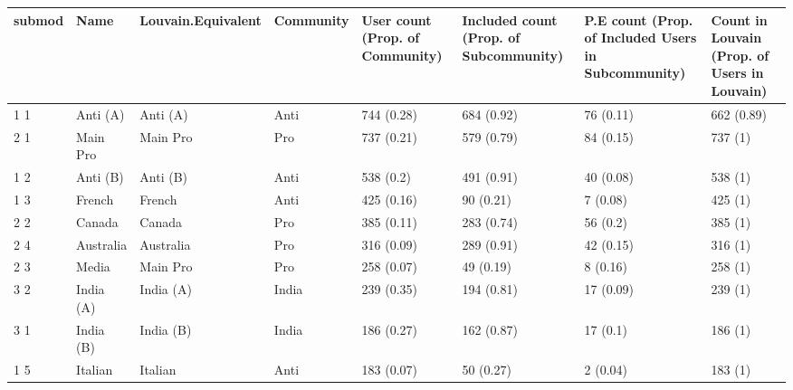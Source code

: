 \begin{table}[ht]
\centering
\begin{tabular}{llllllll}
  \hline
submod & Name & Louvain.Equivalent & Community & User count (Prop. of Community) & Included count (Prop. of Subcommunity) & P.E count (Prop. of Included Users in Subcommunity) & Count in Louvain (Prop. of Users in Louvain) \\ 
  \hline
1 1 & Anti (A) & Anti (A) & Anti & 744 (0.28) & 684 (0.92) & 76 (0.11) & 662 (0.89) \\ 
  2 1 & Main Pro & Main Pro & Pro & 737 (0.21) & 579 (0.79) & 84 (0.15) & 737 (1) \\ 
  1 2 & Anti (B) & Anti (B) & Anti & 538 (0.2) & 491 (0.91) & 40 (0.08) & 538 (1) \\ 
  1 3 & French & French & Anti & 425 (0.16) & 90 (0.21) & 7 (0.08) & 425 (1) \\ 
  2 2 & Canada & Canada & Pro & 385 (0.11) & 283 (0.74) & 56 (0.2) & 385 (1) \\ 
  2 4 & Australia & Australia & Pro & 316 (0.09) & 289 (0.91) & 42 (0.15) & 316 (1) \\ 
  2 3 & Media & Main Pro & Pro & 258 (0.07) & 49 (0.19) & 8 (0.16) & 258 (1) \\ 
  3 2 & India (A) & India (A) & India & 239 (0.35) & 194 (0.81) & 17 (0.09) & 239 (1) \\ 
  3 1 & India (B) & India (B) & India & 186 (0.27) & 162 (0.87) & 17 (0.1) & 186 (1) \\ 
  1 5 & Italian & Italian & Anti & 183 (0.07) & 50 (0.27) & 2 (0.04) & 183 (1) \\ 
   \hline
\end{tabular}
\end{table}
